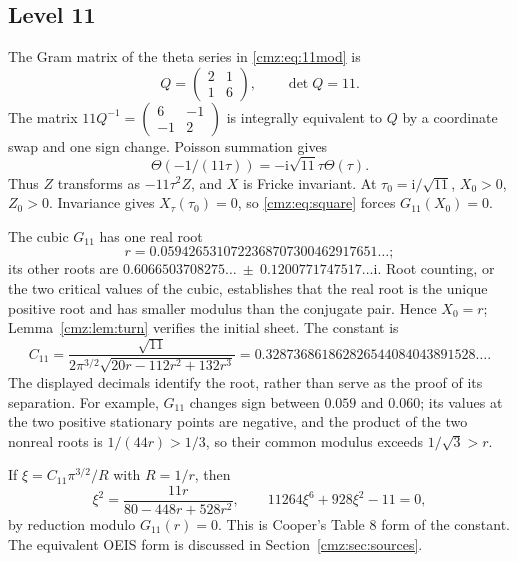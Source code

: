 \documentclass[11pt,letterpaper]{article}
\numberwithin{equation}{section}
\theoremstyle{definition}\newtheorem{definition}[theorem]{Definition}
\theoremstyle{remark}\newtheorem{remark}[theorem]{Remark}
\newcommand{\ii}{\mathrm i}
\begin{document}
\subsection{Level 11}
The Gram matrix of the theta series in \eqref{cmz:eq:11mod} is
\[
Q=\begin{pmatrix}2&1\\1&6\end{pmatrix},\qquad \det Q=11.
\]
The matrix $11Q^{-1}=\left(\begin{smallmatrix}6&-1\\-1&2\end{smallmatrix}\right)$ is integrally equivalent to $Q$ by a coordinate swap and one sign change. Poisson summation gives
\[
\Theta(-1/(11\tau))=-\ii\sqrt{11}\tau\Theta(\tau).
\]
Thus $Z$ transforms as $-11\tau^2 Z$, and $X$ is Fricke invariant. At $\tau_0=\ii/\sqrt{11}$, $X_0>0$, $Z_0>0$. Invariance gives $X_\tau(\tau_0)=0$, so \eqref{cmz:eq:square} forces $G_{11}(X_0)=0$.

The cubic $G_{11}$ has one real root
\[
r=0.0594265310722368707300462917651\ldots;
\]
its other roots are $0.6066503708275\ldots\ \pm\ 0.1200771747517\ldots\ii$. Root counting, or the two critical values of the cubic, establishes that the real root is the unique positive root and has smaller modulus than the conjugate pair. Hence $X_0=r$; Lemma~\ref{cmz:lem:turn} verifies the initial sheet. The constant is
\begin{equation}
C_{11}=\frac{\sqrt{11}}{2\pi^{3/2}\sqrt{20r-112r^2+132r^3}}
 =0.328736861862826544084043891528\ldots.
\label{cmz:eq:C11}
\end{equation}
The displayed decimals identify the root, rather than serve as the proof of its separation. For example, $G_{11}$ changes sign between $0.059$ and $0.060$; its values at the two positive stationary points are negative, and the product of the two nonreal roots is $1/(44r)>1/3$, so their common modulus exceeds $1/\sqrt3>r$.

If $\xi=C_{11}\pi^{3/2}/R$ with $R=1/r$, then
\[
\xi^2=\frac{11r}{80-448r+528r^2},\qquad
11264\xi^6+928\xi^2-11=0,
\]
by reduction modulo $G_{11}(r)=0$. This is Cooper's Table 8 form of the constant. The equivalent OEIS form is discussed in Section~\ref{cmz:sec:sources}.
\end{document}
